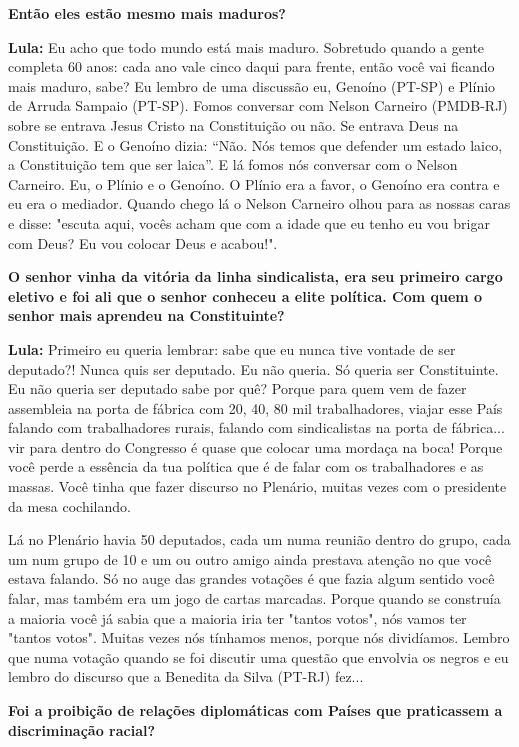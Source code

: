 \textbf{Então eles estão mesmo mais maduros?}

\textbf{Lula:} Eu acho que todo mundo está mais maduro. Sobretudo quando
a gente completa 60 anos: cada ano vale cinco daqui para frente, então
você vai ficando mais maduro, sabe? Eu lembro de uma discussão eu,
Genoíno (PT-SP) e Plínio de Arruda Sampaio (PT-SP). Fomos conversar com
Nelson Carneiro (PMDB-RJ) sobre se entrava Jesus Cristo na Constituição
ou não. Se entrava Deus na Constituição. E o Genoíno dizia: ``Não. Nós
temos que defender um estado laico, a Constituição tem que ser laica''.
E lá fomos nós conversar com o Nelson Carneiro. Eu, o Plínio e o
Genoíno. O Plínio era a favor, o Genoíno era contra e eu era o mediador.
Quando chego lá o Nelson Carneiro olhou para as nossas caras e disse:
"escuta aqui, vocês acham que com a idade que eu tenho eu vou brigar com
Deus? Eu vou colocar Deus e acabou!".

\textbf{O senhor vinha da vitória da linha sindicalista, era seu
primeiro cargo eletivo e foi ali que o senhor conheceu a elite política.
Com quem o senhor mais aprendeu na Constituinte?}

\textbf{Lula:} Primeiro eu queria lembrar: sabe que eu nunca tive
vontade de ser deputado?! Nunca quis ser deputado. Eu não queria. Só
queria ser Constituinte. Eu não queria ser deputado sabe por quê? Porque
para quem vem de fazer assembleia na porta de fábrica com 20, 40, 80 mil
trabalhadores, viajar esse País falando com trabalhadores rurais,
falando com sindicalistas na porta de fábrica... vir para dentro do
Congresso é quase que colocar uma mordaça na boca! Porque você perde a
essência da tua política que é de falar com os trabalhadores e as
massas. Você tinha que fazer discurso no Plenário, muitas vezes com o
presidente da mesa cochilando.

Lá no Plenário havia 50 deputados, cada um numa reunião dentro do grupo,
cada um num grupo de 10 e um ou outro amigo ainda prestava atenção no
que você estava falando. Só no auge das grandes votações é que fazia
algum sentido você falar, mas também era um jogo de cartas marcadas.
Porque quando se construía a maioria você já sabia que a maioria iria
ter "tantos votos", nós vamos ter "tantos votos". Muitas vezes nós
tínhamos menos, porque nós dividíamos. Lembro que numa votação quando se
foi discutir uma questão que envolvia os negros e eu lembro do discurso
que a Benedita da Silva (PT-RJ) fez...

\textbf{Foi a proibição de relações diplomáticas com Países que
praticassem a discriminação racial?}

